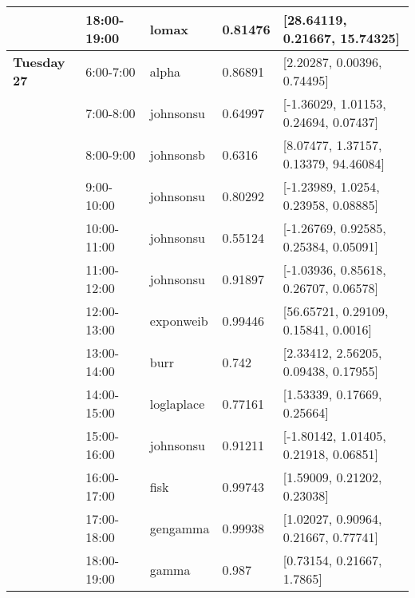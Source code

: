 \begin{longtable}[c]{llllp{5cm}}
\textbf{}             & 18:00-19:00            & lomax                 & 0.81476          & {[}28.64119, 0.21667, 15.74325{]}                      \\ \hline
\textbf{Tuesday 27}   & 6:00-7:00             & alpha                 & 0.86891          & {[}2.20287, 0.00396, 0.74495{]}                        \\
\textbf{}             & 7:00-8:00             & johnsonsu             & 0.64997          & {[}-1.36029, 1.01153, 0.24694, 0.07437{]}              \\
\textbf{}             & 8:00-9:00             & johnsonsb             & 0.6316           & {[}8.07477, 1.37157, 0.13379, 94.46084{]}              \\
\textbf{}             & 9:00-10:00             & johnsonsu             & 0.80292          & {[}-1.23989, 1.0254, 0.23958, 0.08885{]}               \\
\textbf{}             & 10:00-11:00            & johnsonsu             & 0.55124          & {[}-1.26769, 0.92585, 0.25384, 0.05091{]}              \\
\textbf{}             & 11:00-12:00            & johnsonsu             & 0.91897          & {[}-1.03936, 0.85618, 0.26707, 0.06578{]}              \\
\textbf{}             & 12:00-13:00            & exponweib             & 0.99446          & {[}56.65721, 0.29109, 0.15841, 0.0016{]}               \\
\textbf{}             & 13:00-14:00            & burr                  & 0.742            & {[}2.33412, 2.56205, 0.09438, 0.17955{]}               \\
\textbf{}             & 14:00-15:00            & loglaplace            & 0.77161          & {[}1.53339, 0.17669, 0.25664{]}                        \\
\textbf{}             & 15:00-16:00            & johnsonsu             & 0.91211          & {[}-1.80142, 1.01405, 0.21918, 0.06851{]}              \\
\textbf{}             & 16:00-17:00            & fisk                  & 0.99743          & {[}1.59009, 0.21202, 0.23038{]}                        \\
\textbf{}             & 17:00-18:00            & gengamma              & 0.99938          & {[}1.02027, 0.90964, 0.21667, 0.77741{]}               \\
\textbf{}             & 18:00-19:00            & gamma                 & 0.987            & {[}0.73154, 0.21667, 1.7865{]}                         \\ \hline

\end{longtable}
